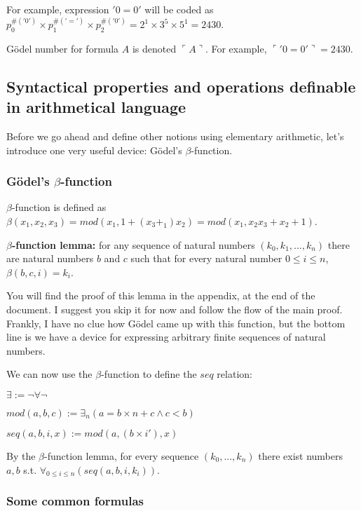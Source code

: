 \documentclass{article}
\begin{document}
For example, expression $'0=0'$ will be coded as
$p_0^{\#('0')} \times p_1^{\#('=')} \times p_2^{\#('0')} = 2^1 \times 3^5 \times 5^1 = 2430$.

Gödel number for formula $A$ is denoted $\ulcorner A \urcorner$.
For example, $\ulcorner '0=0' \urcorner = 2430$.

\subsection{Syntactical properties and operations definable in arithmetical language}

Before we go ahead and define other notions using elementary arithmetic, let's introduce
one very useful device: Gödel's $\beta$-function.

\subsubsection{Gödel's $\beta$-function}

$\beta$-function is defined as $\beta(x_1, x_2, x_3) = mod(x_1, 1+(x_3+_1)x_2) = 
mod(x_1, x_2x_3+x_2+1)$.

\textbf{$\beta$-function lemma:} for any sequence of natural numbers $(k_0, k_1, ..., k_n)$
there are natural numbers $b$ and $c$ such that for every natural number $0 \leqslant i \leqslant n$,
$\beta(b, c, i) = k_i$.

You will find the proof of this lemma in the appendix, at the end of the document. I suggest you skip it
for now and follow the flow of the main proof. Frankly, I have no clue how Gödel came up with this
function, but the bottom line is we have a device for expressing arbitrary finite sequences of natural
numbers.

We can now use the $\beta$-function to define the $seq$ relation:

\begin{center}
    $\exists := \neg \forall \neg$

    $mod(a, b, c) := \exists_n (a = b \times n + c \land c < b)$
    
    $seq(a, b, i, x) := mod(a, (b \times i'), x)$
\end{center}

By the $\beta$-function lemma, for every sequence $(k_0, ..., k_n)$ there exist numbers $a, b$ s.t.
$\forall_{0 \leqslant i \leqslant n}(seq(a, b, i, k_i))$.

\subsubsection{Some common formulas}
\end{document}
